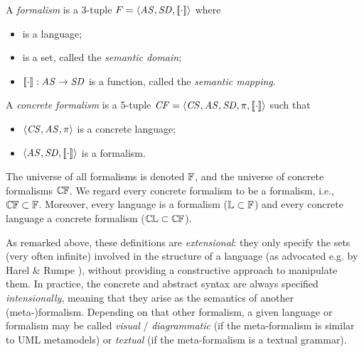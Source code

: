 \begin{newdef}
\begin{Definition}
A \emph{formalism} is a 3-tuple $F=\langle{\ensuremath{\mathit{AS}},\ensuremath{\mathit{SD}},[\![{\cdot}]\!]}\rangle$ where
\begin{itemize}
\item \AS is a language;
\item \SD is a set, called the \emph{semantic domain};
\item $[\![{\cdot}]\!]:\mathit{AS}\rightarrow\mathit{SD}$ is a function, called the \emph{semantic mapping}.
\end{itemize}
A \emph{concrete formalism} is a 5-tuple $\mathit{CF}=\langle{\ensuremath{\mathit{CS}},\ensuremath{\mathit{AS}},\ensuremath{\mathit{SD}},\ensuremath{\pi},[\![{\cdot}]\!]}\rangle$ such that
\begin{itemize}
\item $\langle{\ensuremath{\mathit{CS}},\ensuremath{\mathit{AS}},\ensuremath{\pi}}\rangle$ is a concrete language;
\item $\langle{\ensuremath{\mathit{AS}},\ensuremath{\mathit{SD}},[\![{\cdot}]\!]}\rangle$ is a formalism.
\end{itemize}
The universe of all formalisms is denoted $\mathbb{F}$, and the universe of concrete formalisms $\mathbb{C\mskip-1mu F}$. We regard every concrete formalism to be a formalism, i.e., $\mathbb{C\mskip-1mu F}\subset\mathbb{F}$. Moreover, every language is a formalism ($\mathbb{L}\subset \mathbb{F}$) and every concrete language a concrete formalism ($\mathbb{C\mskip-1mu L}\subset \mathbb{C\mskip-1mu F}$).
\end{Definition}
%
As remarked above, these definitions are \emph{extensional}: they only specify the sets (very often infinite)
involved in the structure of a language (as advocated e.g. by Harel \& Rumpe 
\cite{J:Harel-Rumpe:2004}), without providing a constructive approach to 
manipulate them. In practice, the concrete and abstract syntax are always specified \emph{intensionally}, meaning that they arise as the semantics of another (meta-)formalism. Depending on that other formalism, a given language or formalism may be called \emph{visual} / \emph{diagrammatic} (if the meta-formalism is similar to UML metamodels) or \emph{textual} (if the meta-formalism is a textual grammar).
\end{newdef}
